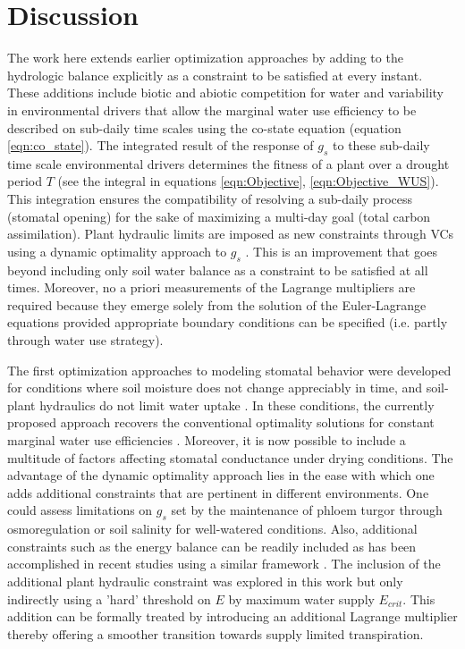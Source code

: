 \documentclass[utf8]{frontiersSCNS} %
\begin{document}
\section{Discussion}

The work here extends earlier optimization approaches by adding to the hydrologic balance explicitly as a constraint to be satisfied at every instant. These additions include biotic and abiotic competition for water and variability in environmental drivers that allow the marginal water use efficiency to be described on sub-daily time scales using the co-state equation (equation \ref{eqn:co_state}). The integrated result of the response of $g_s$ to these sub-daily time scale environmental drivers determines the fitness of a plant over a drought period $T$ (see the integral in equations \ref{eqn:Objective}, \ref{eqn:Objective_WUS}). This integration ensures the compatibility of resolving a sub-daily process (stomatal opening) for the sake of maximizing a multi-day goal (total carbon assimilation).  Plant hydraulic limits are imposed as new constraints through VCs using a dynamic optimality approach to $g_s$ \citep{manzoni_optimization_2013}. This is an improvement that goes beyond including only soil water balance as a constraint to be satisfied at all times. Moreover, no a priori measurements of the Lagrange multipliers are required because they emerge solely from the solution of the Euler-Lagrange equations \citep{witelski_variational_2015} provided appropriate boundary conditions can be specified (i.e. partly through water use strategy).


The first optimization approaches to modeling stomatal behavior were developed for conditions where soil moisture does not change appreciably in time, and soil-plant hydraulics do not limit water uptake \citep{cowan_stomatal_1977}. In these conditions,  the currently proposed approach recovers the conventional optimality solutions for constant marginal water use efficiencies  \citep{katul_stomatal_2009}. Moreover, it is now possible to include a multitude of factors affecting stomatal conductance under drying conditions. The advantage of the dynamic optimality approach lies in the ease with which one adds additional constraints that are pertinent in different environments. One could assess limitations on $g_s$ set by the maintenance of phloem turgor through osmoregulation \citep{sevanto_how_2014} or soil salinity for well-watered conditions. Also, additional constraints such as the energy balance can be readily included as has been accomplished in recent studies using a similar framework \citep{roth2018fossil}.  The inclusion of the additional plant hydraulic constraint was explored in this work but only indirectly using a 'hard' threshold on $E$ by maximum water supply $E_{crit}$. This addition can be formally treated by introducing an additional Lagrange multiplier thereby offering a smoother transition towards supply limited transpiration.
\end{document}
